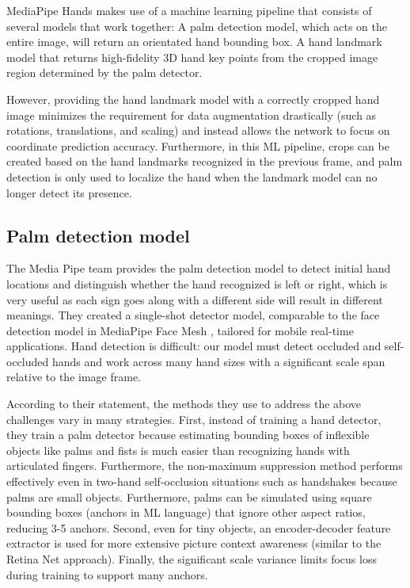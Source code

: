 MediaPipe Hands makes use of a machine learning pipeline that consists of several models that work together: A palm detection model, which acts on the entire image, will return an orientated hand bounding box. A hand landmark model that returns high-fidelity 3D hand key points from the cropped image region determined by the palm detector.

However, providing the hand landmark model with a correctly cropped hand image minimizes the requirement for data augmentation drastically (such as rotations, translations, and scaling) and instead allows the network to focus on coordinate prediction accuracy. Furthermore, in this ML pipeline, crops can be created based on the hand landmarks recognized in the previous frame, and palm detection is only used to localize the hand when the landmark model can no longer detect its presence.
\subsection{ Palm detection model }
The Media Pipe team provides the palm detection model to detect initial hand locations and distinguish whether the hand recognized is left or right, which is very useful as each sign goes along with a different side will result in different meanings. They created a single-shot detector model, comparable to the face detection model in MediaPipe Face Mesh \cite{MediaPipeFaceMesh}, tailored for mobile real-time applications. Hand detection is difficult: our model must detect occluded and self-occluded hands and work across many hand sizes with a significant scale span relative to the image frame.
        
According to their statement, the methods they use to address the above challenges vary in many strategies. First, instead of training a hand detector, they train a palm detector because estimating bounding boxes of inflexible objects like palms and fists is much easier than recognizing hands with articulated fingers. Furthermore, the non-maximum suppression method performs effectively even in two-hand self-occlusion situations such as handshakes because palms are small objects. Furthermore, palms can be simulated using square bounding boxes (anchors in ML language) that ignore other aspect ratios, reducing 3-5 anchors. Second, even for tiny objects, an encoder-decoder feature extractor is used for more extensive picture context awareness (similar to the Retina Net approach). Finally, the significant scale variance limits focus loss during training to support many anchors.

